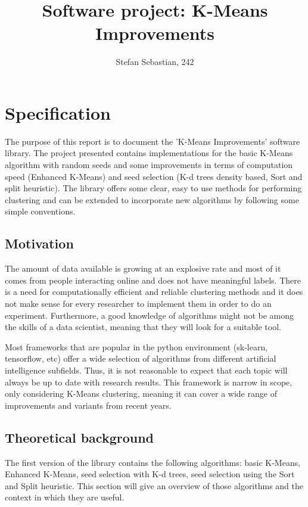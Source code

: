\documentclass[12pt]{article}
\begin{document}
	\title{Software project: K-Means Improvements}
	\author{Stefan Sebastian, 242}
	\date{}
	\maketitle
	
	\newpage
	\tableofcontents
	\newpage
	
	\section{Specification}
	The purpose of this report is to document the 'K-Means Improvements' software library. The project presented contains implementations for the basic K-Means algorithm with random seeds and some improvements in terms of computation speed (Enhanced K-Means) and seed selection (K-d trees density based, Sort and split heuristic). The library offers some clear, easy to use methods for performing clustering and can be extended to incorporate new algorithms by following some simple conventions.
	
	\subsection{Motivation}
	The amount of data available is growing at an explosive rate\cite{HowMuchDataDoWeCreateEveryDay} and most of it comes from people interacting online and does not have meaningful labels. There is a need for computationally efficient and reliable clustering methods and it does not make sense for every researcher to implement them in order to do an experiment. Furthermore, a good knowledge of algorithms might not be among the skills of a data scientist, meaning that they will look for a suitable tool. 
	
	Most frameworks that are popular in the python environment (sk-learn, tensorflow, etc) offer a wide selection of algorithms from different artificial intelligence subfields. Thus, it is not reasonable to expect that each topic will always be up to date with research results. This framework is narrow in scope, only considering K-Means clustering, meaning it can cover a wide range of improvements and variants from recent years.
	
	\subsection{Theoretical background}
	The first version of the library contains the following algorithms: basic K-Means, Enhanced K-Means, seed selection with K-d trees, seed selection using the Sort and Split heuristic. This section will give an overview of those algorithms and the context in which they are useful.
	
\end{document}

